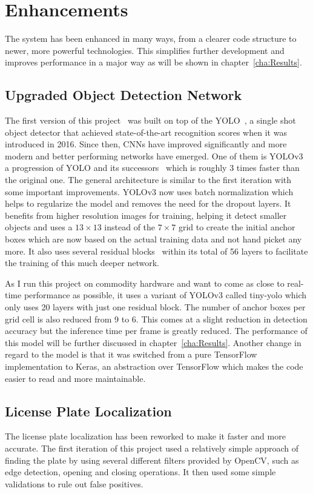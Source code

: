 \chapter{Enhancements} \label{ch:enhancements}

The system has been enhanced in many ways, from a clearer code structure to newer, more powerful technologies.
This simplifies further development and improves performance in a major way as will be shown in chapter~\ref{cha:Results}.


\section{Upgraded Object Detection Network}
The first version of this project~\cite{Berger2018} was built on top of the YOLO~\cite{Redmon}, a single shot object detector that achieved state-of-the-art recognition scores when it was introduced in 2016.
Since then, CNNs have improved significantly and more modern and better performing networks have emerged.
One of them is YOLOv3~\cite{yolov3} a progression of YOLO and its successors~\cite{Redmon2017} which is roughly 3 times faster than the original one.
The general architecture is similar to the first iteration with some important improvements.
YOLOv3 now uses batch normalization which helps to regularize the model and removes the need for the dropout layers.
It benefits from higher resolution images for training, helping it detect smaller objects and uses a $13 \times 13$ instead of the $7 \times 7$ grid to create the initial anchor boxes which are now based on the actual training data and not hand picket any more.
It also uses several residual blocks~\cite{He2016} within its total of 56 layers to facilitate the training of this much deeper network.

As I run this project on commodity hardware and want to come as close to real-time performance as possible, it uses a variant of YOLOv3 called tiny-yolo which only uses 20 layers with just one residual block.
The number of anchor boxes per grid cell is also reduced from 9 to 6.
This comes at a slight reduction in detection accuracy but the inference time per frame is greatly reduced.
The performance of this model will be further discussed in chapter~\ref{cha:Results}.
Another change in regard to the model is that it was switched from a pure TensorFlow implementation to Keras, an abstraction over TensorFlow which makes the code easier to read and more maintainable.


\section{License Plate Localization}
The license plate localization has been reworked to make it faster and more accurate.
The first iteration of this project used a relatively simple approach of finding the plate by using several different filters provided by OpenCV, such as edge detection, opening and closing operations.
It then used some simple validations to rule out false positives.

